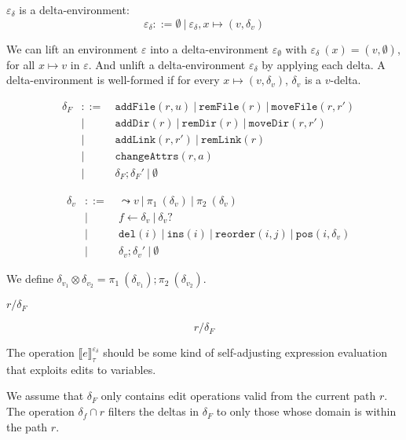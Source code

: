 \documentclass{report}
\theoremstyle{theorem}
\begin{document}
$\varepsilon_\delta$ is a delta-environment:
\begin{displaymath}
	\varepsilon_\delta ::= \emptyset ~|~ \varepsilon_\delta,x \mapsto (v,\delta_v)
\end{displaymath}

We can lift an environment $\varepsilon$ into a delta-environment $\varepsilon_\emptyset$ with $\varepsilon_\delta~(x) = (v,\emptyset)$, for all $x \mapsto v$ in $\varepsilon$.
And unlift a delta-environment $\varepsilon_\delta$ by applying each delta. A delta-environment is well-formed if for every $x \mapsto (v,\delta_v)$, $\delta_v$ is a $v$-delta.

\begin{align*}
	&\delta_F & ::= & ~\mathtt{addFile}(r,u) ~|~ \mathtt{remFile}(r) ~|~ \mathtt{moveFile}(r,r')\\
	&         & |   & ~\mathtt{addDir}(r) ~|~ \mathtt{remDir}(r) ~|~ \mathtt{moveDir}(r,r')\\
	&         & |   & ~\mathtt{addLink}(r,r') ~|~ \mathtt{remLink}(r)\\
	&         & |   & ~\mathtt{changeAttrs}(r,a)\\
	&         & |   & ~\delta_F ; {\delta_F}' ~|~ \emptyset
\end{align*}

\begin{align*}
	&\delta_v & ::= & ~\leadsto v ~|~ \pi_1~(\delta_v) ~|~ \pi_2~(\delta_v)\\
	&         & |   & ~f \leftarrow \delta_v ~|~ \delta_v?\\
	&         & |   & ~\mathtt{del}(i) ~|~ \mathtt{ins}(i) ~|~ \mathtt{reorder}(i,j) ~|~ \mathtt{pos}(i,\delta_v)\\
	&         & |   & ~\delta_v ; {\delta_v}' ~|~ \emptyset
\end{align*}

We define $\delta_{v_1} \otimes \delta_{v_2} = \pi_1~(\delta_{v_1}) ; \pi_2~(\delta_{v_2})$.

$\boxed{r/\delta_F}$

\begin{displaymath}
	r/\delta_F
\end{displaymath}

The operation $\llbracket e \rrbracket^{\varepsilon_\delta}_{\tau}$ should be some kind of self-adjusting expression evaluation that exploits edits to variables.

We assume that $\delta_F$ only contains edit operations valid from the current path $r$.
The operation $\delta_f \cap r$ filters the deltas in $\delta_F$ to only those whose domain is within the path $r$.
\end{document}
